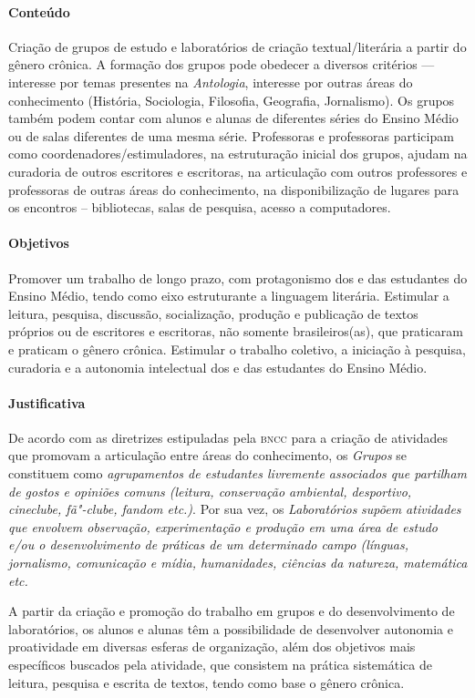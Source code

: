 \documentclass{extarticle}
\begin{document}
\paragraph{Conteúdo} Criação de grupos de estudo e laboratórios de criação
textual/literária a partir do gênero crônica. A formação dos grupos pode
obedecer a diversos critérios --- interesse por temas presentes na
\emph{Antologia}, interesse por outras áreas do conhecimento (História,
Sociologia, Filosofia, Geografia, Jornalismo). Os grupos também podem
contar com alunos e alunas de diferentes séries do Ensino Médio ou de
salas diferentes de uma mesma série. Professoras e professoras
participam como coordenadores/estimuladores, na estruturação inicial dos
grupos, ajudam na curadoria de outros escritores e escritoras, na
articulação com outros professores e professoras de outras áreas do
conhecimento, na disponibilização de lugares para os encontros --
bibliotecas, salas de pesquisa, acesso a computadores.

\paragraph{Objetivos} Promover um trabalho de longo prazo, com
protagonismo dos e das estudantes do Ensino Médio, tendo como eixo
estruturante a linguagem literária. Estimular a leitura, pesquisa,
discussão, socialização, produção e publicação de textos próprios ou de
escritores e escritoras, não somente brasileiros(as), que praticaram e
praticam o gênero crônica. Estimular o trabalho coletivo, a iniciação à
pesquisa, curadoria e a autonomia intelectual dos e das estudantes do
Ensino Médio.

\paragraph{Justificativa} De acordo com as diretrizes estipuladas pela
\textsc{bncc} para a criação de atividades que promovam a articulação entre áreas
do conhecimento, os \textit{Grupos} se constituem como
\emph{agrupamentos de estudantes livremente associados que partilham de
gostos e opiniões comuns (leitura, conservação ambiental, desportivo,
cineclube, fã"-clube, fandom etc.)}. Por sua vez, os
\textit{Laboratórios} \emph{supõem atividades que envolvem observação,
experimentação e produção em uma área de estudo e/ou o desenvolvimento
de práticas de um determinado campo (línguas, jornalismo, comunicação e
mídia, humanidades, ciências da natureza, matemática etc.}

A partir da criação e promoção do trabalho em grupos e do
desenvolvimento de laboratórios, os alunos e alunas têm a possibilidade
de desenvolver autonomia e proatividade em diversas esferas de
organização, além dos objetivos mais específicos buscados pela
atividade, que consistem na prática sistemática de leitura, pesquisa e
escrita de textos, tendo como base o gênero crônica.
\end{document}
